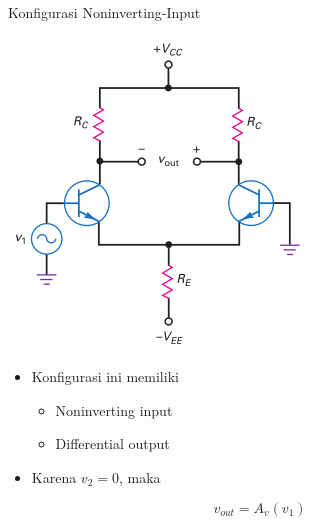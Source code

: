 \documentclass[aspectratio=169]{beamer}
\begin{document}
\begin{frame}{Konfigurasi Noninverting-Input}
	\begin{multicols}{2}
		\begin{center}
			\includegraphics[height=0.7\textheight]{gambar/01.diff-amp/01.noninverting_input+differential_output}
		\end{center}
		\columnbreak
		\begin{itemize}
			\item Konfigurasi ini memiliki
			\begin{itemize}
				\item Noninverting input
				\item Differential output
			\end{itemize}
			\item Karena $ v_2 = 0 $, maka
		\end{itemize}
		\begin{equation} \label{pers.3}
			v_{out} = A_v (v_1)
		\end{equation}
	\end{multicols}
\end{frame}
\end{document}
